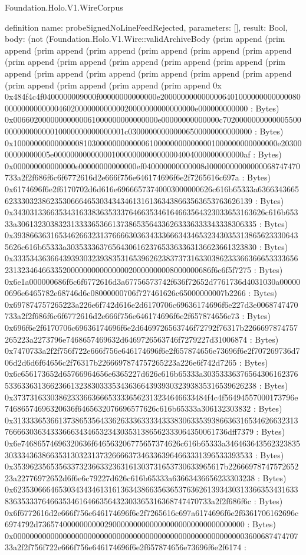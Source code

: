 \begin{lexlean}{Foundation.Holo.V1.WireCorpus}
\begin{semanticmodule}
definition{
  name: probeSignedNoLineFeedRejected,
  parameters: [],
  result: Bool,
  body: (not (Foundation.Holo.V1.Wire::validArchiveBody (prim append (prim append (prim append (prim append (prim append (prim append (prim append (prim append (prim append (prim append (prim append (prim append (prim append (prim append (prim append (prim append (prim append (prim append (prim append (prim append (prim append (prim append 0x 0x484f4c4f0400000009000f00000000000000e20000000000000064010000000000000800000000000000460200000000000020000000000000000e000000000000 : Bytes) 0x00660200000000000061000000000000000e00000000000000c702000000000000550000000000000010000000000000001c030000000000006500000000000000 : Bytes) 0x1000000000000000810300000000000061000000000000001000000000000000e2030000000000005e0000000000000010000000000000004004000000000000af : Bytes) 0x000000000000000e00000000000000ef040000000000008d0000000000000068747470733a2f2f686f6c6f6772616d2e666f756e646174696f6e2f7265616c697a : Bytes) 0x6174696f6e2f6170702d6d616e69666573740003000000626c616b65333a6366343665623330323862353066646530343434613161363438663563653763626139 : Bytes) 0x3430313366353431633836353337646635346164663564323033653163626c616b65333a3061323038323133336536613738653564336263336333343338306335 : Bytes) 0x3938663631653462663231376666303634333666343465323430353138656233306435626c616b65333a3035333637656430616237653363363136623661323830 : Bytes) 0x33353436366439393032393835316539626238373731633038623336636665333365623132346466335200000000000000020000000008000000686f6c6f5f7275 : Bytes) 0x6e1a000000686f6c6f6772616d3a67756573742f636f72652d7761736d4031030a000000696e6465782e68746d6c08000000706f727461626c65000000007b2266 : Bytes) 0x697874757265223a226e6f742d616e2d6170706c69636174696f6e227d3e0068747470733a2f2f686f6c6f6772616d2e666f756e646174696f6e2f657874656e73 : Bytes) 0x696f6e2f6170706c69636174696f6e2d6469726563746f72792f76317b2266697874757265223a2273796e7468657469632d6469726563746f7279227d31006874 : Bytes) 0x7470733a2f2f756f722e666f756e646174696f6e2f657874656e73696f6e2f707269736d706d2d6d6f64656c2f76317b2266697874757265223a226e6f742d7265 : Bytes) 0x6c656173652d65766964656e6365227d626c616b65333a303533363765643061623765336336313662366132383033353436366439393032393835316539626238 : Bytes) 0x37373163303862333663666533336562313234646633484f4c4f56494557000173796e74686574696320636f6465632076696577626c616b65333a306132303832 : Bytes) 0x313333653661373865356433626333633334333830633539386636316534626632313766663036343336663434653234303531386562333064350061736dff7379 : Bytes) 0x6e74686574696320636f646563206775657374626c616b65333a346463643562323835303334363866353130323137326666373463363964663331396533393533 : Bytes) 0x353962356535633732366332363161303731653730633965617b2266697874757265223a22776972652d6f6e6c79227d626c616b65333a63663436656233303238 : Bytes) 0x62353066646530343434613161363438663563653763626139343031336635343163383635333764663534616466356432303365316368747470733a2f2f686f6c : Bytes) 0x6f6772616d2e666f756e646174696f6e2f7265616c697a6174696f6e2f6361706162696c6974792d73657400000000002900000000000000000000000000000000 : Bytes) 0x00000000000000000000000000000000000000000000000000000000360068747470733a2f2f756f722e666f756e646174696f6e2f657874656e73696f6e2f6174 : }
\end{semanticmodule}
\end{lexlean}
